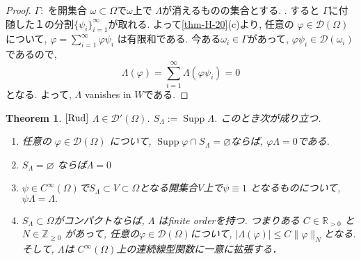 \documentclass[dvipdfmx,a4paper,11pt]{article} %
\newtheorem{thm}{Theorem}[section]
\theoremstyle{definition}
\theoremstyle{remark}
\numberwithin{equation}{section}
\begin{document}
\begin{proof}
\(\Gamma:\) を開集合 \(\omega \subset \Omega\)で$\omega$上で \(\Lambda\)が消えるものの集合とする. .  
すると \(\Gamma\)に付随した１の分割\(\{\psi_i\}_{i=1}^\infty\)が取れる. 
よって\ref{thm-H-20}(c)より, 任意の \(\varphi \in \mathcal{D}(\Omega)\)について, \(\varphi = \sum_{i=1}^\infty \varphi \psi_i\) は有限和である. 
今ある\(\omega_i \in \Gamma\)があって,  \(\varphi \psi_i \in \mathcal{D}(\omega_i)\) 
であるので, 
\[
\Lambda(\varphi) = \sum_{i=1}^\infty \Lambda(\varphi \psi_i) = 0
\]
となる. よって, 
\(\Lambda\) vanishes in \(W\)である. 
\end{proof}


\begin{tcolorbox}[mybox]
\begin{thm}{$\cite[Thm 6.24]{Rud}$}
\label{thm-H-25}
\(\Lambda \in \mathcal{D}'(\Omega)\).  
\(S_\Lambda := \operatorname{Supp} \Lambda\).  
このとき次が成り立つ. 
\begin{enumerate}[label=$(\alph*)$]
\item 任意の \( \varphi \in \mathcal{D}(\Omega)\) について, 
\(\operatorname{Supp}\varphi \cap S_\Lambda = \varnothing\)ならば, \(\varphi \Lambda = 0\)である.
\item \(S_\Lambda = \varnothing\) ならば\(\Lambda = 0\)  
\item  \(\psi \in C^\infty(\Omega)\)で\(S_{\Lambda} \subset V \subset \Omega\)となる開集合$V$上で\(\psi \equiv 1\) となるものについて,  \(\psi \Lambda = \Lambda.\)  
\item  \(S_\Lambda \subset \Omega\)がコンパクトならば,  \(\Lambda\) はfinite orderを持つ. 
つまりある \(C \in \mathbb{R}_{>0}\) と \(N \in \mathbb{Z}_{\ge 0}\) があって, 任意の$\varphi \in \mathcal{D}(\Omega)$について, \(|\Lambda(\varphi)| \le C \|\varphi\|_N \)となる. 
そして, \(\Lambda\)は \(C^\infty(\Omega)\)上の連続線型関数に一意に拡張する．  
\end{enumerate}
\end{thm}
\end{tcolorbox}

\end{document}
